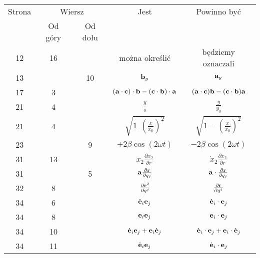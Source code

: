 \documentclass[a4paper,11pt]{article}
\numberwithin{equation}{section}
\begin{document}
\begin{center}

  \begin{tabular}{|c|c|c|c|c|}
    \hline
    Strona & \multicolumn{2}{c|}{Wiersz} & Jest
                              & Powinno być \\ \cline{2-3}
    & Od góry & Od dołu & & \\
    \hline
    12  & 16 & & można określić & będziemy oznaczali \\
    13  & & 10 & $\mathbf{b}_{ y }$ & $\mathbf{a}_{ y }$ \\
    17  &  3 & & $( \mathbf{a} \cdot \mathbf{c} ) \cdot \mathbf{b}
                 - ( \mathbf{c} \cdot \mathbf{b} ) \cdot \mathbf{a}$
           & $( \mathbf{a} \cdot \mathbf{c} ) \mathbf{b}
             - ( \mathbf{c} \cdot \mathbf{b} ) \mathbf{a}$ \\
    21  &  4 & & $\frac{ y }{ { }_{ 0 } }$ & $\frac{ y }{ { y }_{ 0 } }$ \\
    21  &  4 & & $\sqrt{ 1 \:\: \left( \frac{ x }{ x_{ 0 } } \right)^{ 2 } }$
           & $\sqrt{ 1 - \left( \frac{ x }{ x_{ 0 } } \right)^{ 2 } } $ \\
    23  & &  9 & $+2\beta \cos( 2\omega t )$ & $-2\beta \cos( 2\omega t )$ \\
    31  & 13 & & $x_{ 2 } \frac{ \partial x_{ 2 } }{ \partial r }$
           & $\dot{ x }_{ 2 } \frac{ \partial x_{ 2 } }{ \partial r }$ \\
    31  & &  5 & $\mathbf{a} \frac{ \partial \mathbf{r} }{ \partial q_{ j } }$
           & $\mathbf{a} \cdot \frac{ \partial \mathbf{r} }{ \partial q_{ j } }$ \\
    32  &  8 & & $\frac{ \partial \mathbf{r}^{ 2 } }{ \partial { q^{ j } } }$
           & $\frac{ \partial \mathbf{r} }{ \partial { q^{ j } } }$ \\
    34  &  6 & & $\dot{ \mathbf{e} }_{ i } \mathbf{e}_{ j }$
           & $\dot{ \mathbf{e} }_{ i } \cdot \mathbf{e}_{ j }$ \\
    34  &  8 & & $\mathbf{e}_{ i } \mathbf{e}_{ j }$
           & $\mathbf{e}_{ i } \cdot \mathbf{e}_{ j }$ \\
    34  & 10 & & $\dot{ \mathbf{e} }_{ i } \mathbf{e}_{ j }
                 + \mathbf{e}_{ i } \dot{ \mathbf{e} }_{ j }$
           & $\dot{ \mathbf{e} }_{ i } \cdot \mathbf{e}_{ j }
             + \mathbf{e}_{ i } \cdot \dot{ \mathbf{e} }_{ j }$ \\
    34  & 11 & & $\dot{ \mathbf{e} }_{ i } \mathbf{e}_{ j }$
           & $\dot{ \mathbf{e} }_{ i } \cdot \mathbf{e}_{ j }$ \\

\end{tabular}
\end{center}
\end{document}
